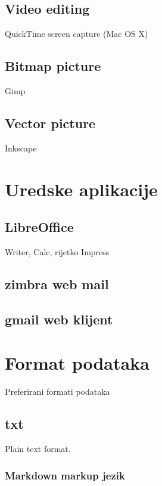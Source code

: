 \documentclass[times, utf8, seminar]{fit}
\begin{document}
\section{Video editing}

QuickTime screen capture (Mac OS X)

\section{Bitmap picture}

Gimp

\section{Vector picture}

Inkscape

\chapter{Uredske aplikacije}

\section{LibreOffice}

Writer, Calc, rijetko Impress

\section{zimbra web mail}

\section{gmail web klijent}

\chapter{Format podataka}

Preferirani formati podataka

\section{txt}

Plain text format.

\subsection{Markdown markup jezik}
\end{document}
